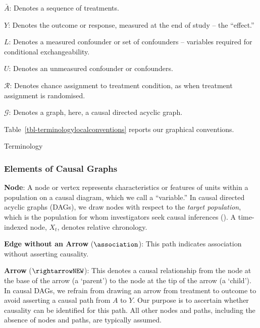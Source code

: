 \documentclass[
  single column]{article}
\begin{document}
\textbf{\(\bar{A}\)}: Denotes a sequence of treatments.

\textbf{\(Y\)}: Denotes the outcome or response, measured at the end of
study -- the ``effect.''

\textbf{\(L\)}: Denotes a measured confounder or set of confounders --
variables required for conditional exchangeability.

\textbf{\(U\)}: Denotes an unmeasured confounder or confounders.

\textbf{\(\mathcal{R}\)}: Denotes chance assignment to treatment
condition, as when treatment assignment is randomised.

\textbf{\(\mathcal{G}\)}: Denotes a graph, here, a causal directed
acyclic graph.

Table~\ref{tbl-terminologylocalconventions} reports our graphical
conventions.

\begin{table}

\caption{\label{tbl-terminologylocalconventions}Terminology}

\centering{

\terminologylocalconventions

}

\end{table}%

\subsubsection{Elements of Causal
Graphs}\label{elements-of-causal-graphs}

\textbf{Node}: A node or vertex represents characteristics or features
of units within a population on a causal diagram, which we call a
``variable.'' In causal directed acyclic graphs (DAGs), we draw nodes
with respect to the \emph{target population}, which is the population
for whom investigators seek causal inferences
(). A time-indexed
node, \(X_t\), denotes relative chronology.

\textbf{Edge without an Arrow} (\(\association\)): This path indicates
association without asserting causality.

\textbf{Arrow} (\(\rightarrowNEW\)): This denotes a causal relationship
from the node at the base of the arrow (a `parent') to the node at the
tip of the arrow (a `child'). In causal DAGs, we refrain from drawing an
arrow from treatment to outcome to avoid asserting a causal path from
\(A\) to \(Y\). Our purpose is to ascertain whether causality can be
identified for this path. All other nodes and paths, including the
absence of nodes and paths, are typically assumed.
\end{document}
